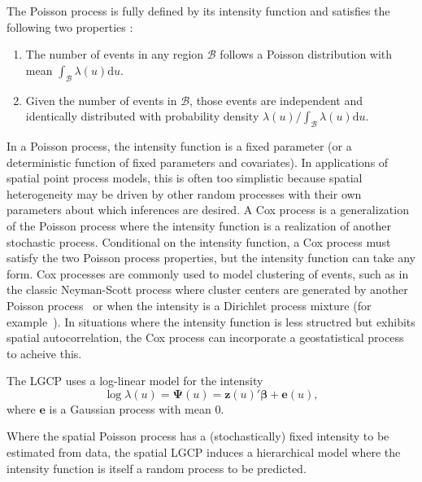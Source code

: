 \documentclass[]{interact}
\begin{document}
The Poisson process is fully defined by its intensity function and satisfies
the following two properties \cite{moellerwaagepetersen}:
\begin{enumerate}
\item The number of events in any region \(\mathcal{B}\) follows a Poisson
distribution with mean
\(\int_{\mathcal{B}} \lambda(u)\mathrm{d}u\).
\item Given the number of events in \(\mathcal{B}\), those events are
independent and identically distributed with probability density
\(\lambda(u) / \int_{\mathcal{B}} \lambda(u)\mathrm{d}u\).
\end{enumerate}

In a Poisson process, the intensity function is a fixed parameter (or a
deterministic function of fixed parameters and covariates). In applications of
spatial point process models, this is often too simplistic because spatial
heterogeneity may be driven by other random processes with their own parameters
about which inferences are desired. A Cox process is a generalization of the
Poisson process where the intensity function is a realization of another
stochastic process. Conditional on the intensity function, a Cox process must
satisfy the two Poisson process properties, but the intensity function can take
any form. Cox processes are commonly used to model clustering of events, such
as in the classic Neyman-Scott process where cluster centers are generated by
another Poisson process~\cite{neymanscott} or when the intensity is a Dirichlet
process mixture (for example~\cite{taddy}). In situations where the intensity
function is less structred but exhibits spatial autocorrelation, the Cox
process can incorporate a geostatistical process to acheive this.

The LGCP uses a log-linear model for the intensity
\begin{displaymath}
\log\lambda(u) = \boldsymbol{\Psi}(u)
= \mathbf{z}(u)' \boldsymbol{\beta} + \mathbf{e}(u),
\end{displaymath}
where \(\mathbf{e}\) is a Gaussian process with mean 0.

Where the spatial Poisson process has a (stochastically) fixed intensity to be
estimated from data, the spatial LGCP induces a hierarchical model where the
intensity function is itself a random process to be predicted.
\end{document}
